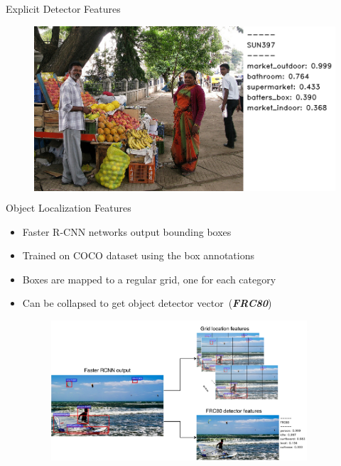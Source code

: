 \documentclass{beamer}
\begin{document}
\begin{frame}{Explicit Detector Features}
\begin{figure}[h]
\begin{columns}
    \hspace{-5mm}
    \centering
    \includegraphics[width=1.0\textwidth]{images/69356.png}
    \end{columns}
  \end{figure}
\end{frame}
\begin{frame}{Object Localization Features}
    \begin{itemize}
        \item Faster R-CNN networks output bounding boxes 
        \item Trained on COCO dataset using the box annotations 
        \item Boxes are mapped to a regular grid, one for each category 
        \item Can be collapsed to get object detector vector~(\textbf{\emph{FRC80}}) 
        \begin{figure}[h]
          \includegraphics[width=0.9\textwidth]{images/FrcnnFeats.pdf}
        \end{figure}

    \end{itemize}
\end{frame}
\end{document}
